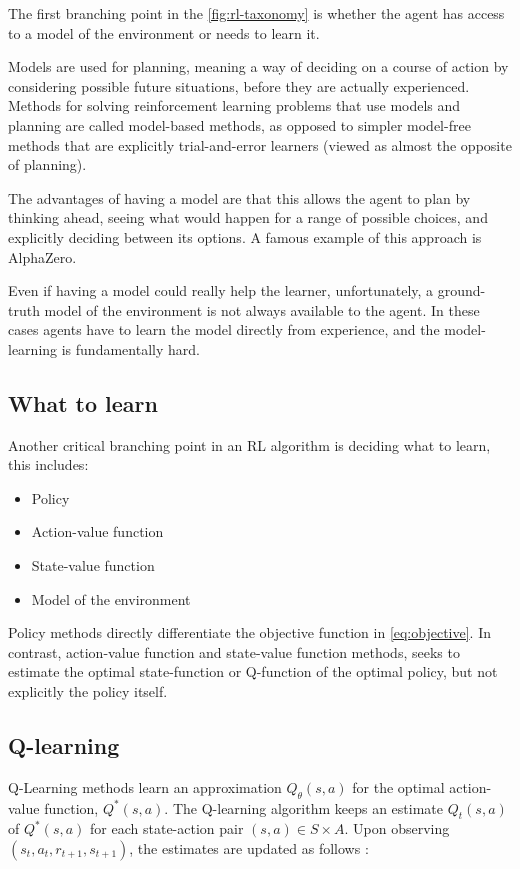 \documentclass{article}
\begin{document}
The first branching point in the \autoref{fig:rl-taxonomy} is whether the agent has access to a model  of the environment or needs to learn it.

Models are used for planning, meaning a way of deciding on a course of action by considering possible future situations, before they are actually experienced. Methods for solving reinforcement learning problems that use models and planning are called model-based methods, as opposed to simpler model-free methods that are explicitly trial-and-error learners (viewed as almost the opposite of planning).

The advantages of having a model are that this allows the agent to plan by thinking ahead, seeing what would happen for a range of possible choices, and explicitly deciding between its options. A famous example of this approach is AlphaZero. \cite{silver2017mastering}

Even if having a model could really help the learner, unfortunately, a ground-truth model of the environment is not always available to the agent. In these cases agents have to learn the model directly from experience, and the model-learning is fundamentally hard.

\subsection{What to learn}

Another critical branching point in an RL algorithm is deciding what to learn, this includes:
\begin{itemize}
	\item Policy
	\item Action-value function
	\item State-value function
	\item Model of the environment
\end{itemize}

Policy methods directly differentiate the objective function in \autoref{eq:objective}. In contrast, action-value function and state-value function methods, seeks to estimate the optimal state-function or Q-function of the optimal policy, but not explicitly the policy itself.


\subsection{Q-learning}


Q-Learning methods learn an approximation $Q_{\theta}(s,a)$ for the optimal action-value function, $Q^*(s,a)$. The Q-learning algorithm keeps an estimate $Q_t(s,a)$ of $Q^*(s,a)$ for each state-action pair $(s,a) \in S \times A$. Upon observing $(s_t, a_t, r_{t+1}, s_{t+1})$, the estimates are updated as follows \cite{series/synthesis/2010Szepesvari}:
\end{document}
